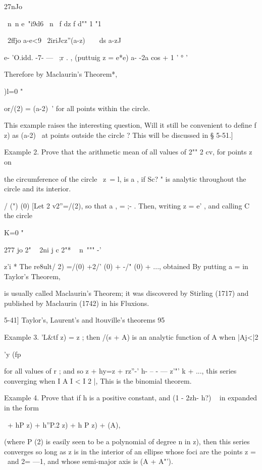 {{27nJo 

\ n\ n  e~"i9d6 \  n \ f dz f d"" 1 "1 

~2ffjo a-e<9 ~2iriJcz''(a-z)~~\ \  ds a-zJ 



e- 'O.idd. -7-   —  ~;r . , (puttuig z = e*e) 
a- -2a cos   + 1 '   ° ' 



Therefore by Maclaurin's Theorem*, 

)l=0 " 

or/(2) = (a-2)~' for all points within the circle. 

This example raises the interesting question, Will it still be convenient to define f z) 
as (a-2)~  at points outside the circle ? This will be discussed in § 5-51.] 

Example 2. Prove that the arithmetic mean of all values of 2"" 2 cv, for points z on 

the circumference of the circle \ z\ = l, is a , if Sc? " is analytic throughout the circle and 
its interior. 

/ (") (0) 
[Let 2  v2''=/(2), so that a , = ;- . Then, writing z = e' , and calling C the circle 

K=0 "   

277 jo 2" ~ 2ni j c 2"*  ~ n\ """ -' 

z'i 
* The re8ult/ 2) =/(0) +2/' (0) + -/" (0) + ..., obtained By putting a = in Taylor's Theorem, 

is usually called Maclaurin's Theorem; it was discovered by Stirling (1717) and published by 
Maclaurin (1742) in his Fluxions. 



5-41] Taylor's, Laurent's and ltouville's theorems 95 



Example 3. 'L\&tf z) = z ; then /(s + A) is an analytic function of A when |Aj<|2 

'y (fp \ \  

for all values of r ; and so  z + hy=z  + rz''-' h- -- - — z'"'  k  + ..., this series converging 
when I A I < I 2 |, This is the binomial theorem. 

Example 4. Prove that if h is a positive constant, and (1 - 2zh- h?) ~   in expanded in 
the form 

\ + hP  z) + h''P.2 z) + h P  z) + (A), 

(where P (2) is easily seen to be a polynomial of degree n in z), then this series converges 
so long as z is in the interior of an ellipse whose foci are the points z = \ and 2= —1, and 
whose semi-major axis is   (A + A"'). 

}}
